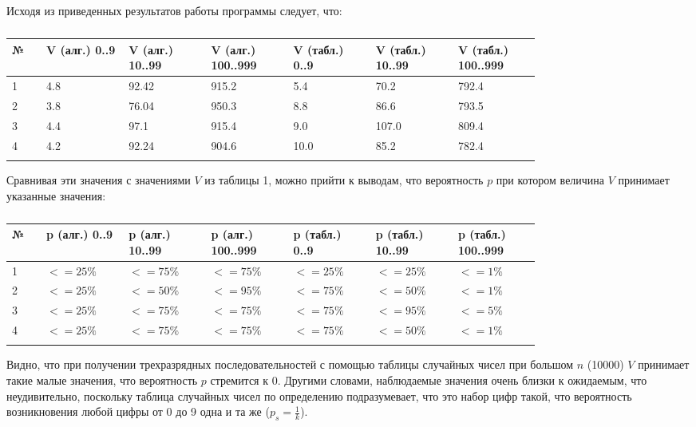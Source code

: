 \documentclass[a4paper,12pt]{article}
\begin{document}
	Исходя из приведенных результатов работы программы следует, что:
	\begin{center}
		\begin{longtable}[h!]{|p{0.05\linewidth}|p{0.12\linewidth}|p{0.12\linewidth}|p{0.12\linewidth}|p{0.12\linewidth}|p{0.12\linewidth}|p{0.12\linewidth}|}
			\hline
			{№} & {V (алг.) 0..9} & {V (алг.) 10..99} & {V (алг.) 100..999} & {V (табл.) 0..9} & {V (табл.) 10..99} & {V (табл.) 100..999}\\
			\hline
			{1} & {4.8} & {92.42} & {915.2} & {5.4} & {70.2} & {792.4}\\
			\hline
			{2} & {3.8} & {76.04} & {950.3} & {8.8} & {86.6} & {793.5}\\
			\hline
			{3} & {4.4} & {97.1} & {915.4} & {9.0} & {107.0} & {809.4}\\
			\hline
			{4} & {4.2} & {92.24} & {904.6} & {10.0} & {85.2} & {782.4}\\
			\hline
			\caption{}
		\end{longtable}
	\end{center}
	
	Сравнивая эти значения с значениями $V$ из таблицы 1, можно прийти к выводам, что вероятность $p$ при котором величина $V$ принимает указанные значения:
	
	\begin{center}
		\begin{longtable}[h!]{|p{0.05\linewidth}|p{0.12\linewidth}|p{0.12\linewidth}|p{0.12\linewidth}|p{0.12\linewidth}|p{0.12\linewidth}|p{0.12\linewidth}|}
			\hline
			{№} & {p (алг.) 0..9} & {p (алг.) 10..99} & {p (алг.) 100..999} & {p (табл.) 0..9} & {p (табл.) 10..99} & {p (табл.) 100..999}\\
			\hline
			{1} & {$<=25\%$} & {$<=75\%$} & {$<=75\%$} & {$<=25\%$} & {$<=25\%$} & {$<=1\%$}\\
			\hline
			{2} & {$<=25\%$} & {$<=50\%$} & {$<=95\%$} & {$<=75\%$} & {$<=50\%$} & {$<=1\%$}\\
			\hline
			{3} & {$<=25\%$} & {$<=75\%$} & {$<=75\%$} & {$<=75\%$} & {$<=95\%$} & {$<=5\%$}\\
			\hline
			{4} & {$<=25\%$} & {$<=75\%$} & {$<=75\%$} & {$<=75\%$} & {$<=50\%$} & {$<=1\%$}\\
			\hline
			\caption{}
		\end{longtable}
	\end{center}

	Видно, что при получении трехразрядных последовательностей с помощью таблицы случайных чисел при большом $n$ (10000) $V$ принимает такие малые значения, что вероятность $p$ стремится к 0. Другими словами, наблюдаемые значения очень близки к ожидаемым, что неудивительно, поскольку таблица случайных чисел по определению подразумевает, что это набор цифр такой, что вероятность возникновения любой цифры от 0 до 9 одна и та же ($p_s = \frac{1}{k}$).
	
\end{document}
